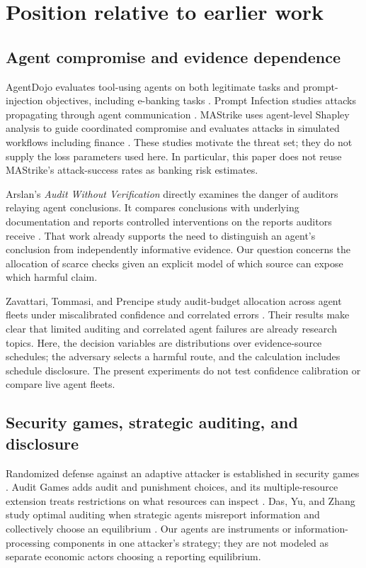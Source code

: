 \documentclass[11pt,letterpaper]{article}
\begin{document}
\section{Position relative to earlier work}

\subsection{Agent compromise and evidence dependence}

AgentDojo evaluates tool-using agents on both legitimate tasks and prompt-injection objectives, including e-banking tasks \cite{agentdojo}. Prompt Infection studies attacks propagating through agent communication \cite{infection}. MAStrike uses agent-level Shapley analysis to guide coordinated compromise and evaluates attacks in simulated workflows including finance \cite{mastrike}. These studies motivate the threat set; they do not supply the loss parameters used here. In particular, this paper does not reuse MAStrike's attack-success rates as banking risk estimates.

Arslan's \emph{Audit Without Verification} directly examines the danger of auditors relaying agent conclusions. It compares conclusions with underlying documentation and reports controlled interventions on the reports auditors receive \cite{relay2026}. That work already supports the need to distinguish an agent's conclusion from independently informative evidence. Our question concerns the allocation of scarce checks given an explicit model of which source can expose which harmful claim.

Zavattari, Tommasi, and Prencipe study audit-budget allocation across agent fleets under miscalibrated confidence and correlated errors \cite{fleet2026}. Their results make clear that limited auditing and correlated agent failures are already research topics. Here, the decision variables are distributions over evidence-source schedules; the adversary selects a harmful route, and the calculation includes schedule disclosure. The present experiments do not test confidence calibration or compare live agent fleets.

\subsection{Security games, strategic auditing, and disclosure}

Randomized defense against an adaptive attacker is established in security games \cite{securitygames}. Audit Games adds audit and punishment choices, and its multiple-resource extension treats restrictions on what resources can inspect \cite{auditgames,multiaudit}. Das, Yu, and Zhang study optimal auditing when strategic agents misreport information and collectively choose an equilibrium \cite{optimal2026}. Our agents are instruments or information-processing components in one attacker's strategy; they are not modeled as separate economic actors choosing a reporting equilibrium.
\end{document}
